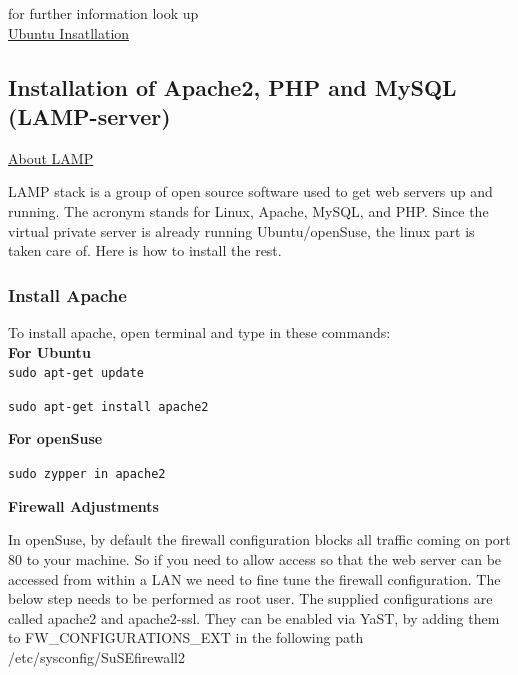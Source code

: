 \documentclass[16pt]{article}
\begin{document}
for further information look up \\

\href{https://help.ubuntu.com/community/WindowsDualBoot}{Ubuntu Insatllation}
  
\hfill


\subsection{Installation of Apache2, PHP and MySQL (LAMP-server)}

\vspace{0.5cm}

{\underline{\Large{About LAMP}}}

  LAMP stack is a group of open source software used to get web servers up
  and running. The acronym stands for Linux, Apache, MySQL, and PHP. Since
  the virtual private server is already running Ubuntu/openSuse, the linux
  part is taken care of. Here is how to install the rest.


  
  

  

  \subsubsection{Install Apache}
  
  \hfill

  To install apache, open terminal and type in these commands: \\
  \textbf{For Ubuntu} \\
  \texttt{sudo apt-get update} 

  \texttt{sudo apt-get install apache2}

  \textbf{For openSuse}

  \texttt{sudo zypper in apache2}

  \textbf{Firewall Adjustments}

  In openSuse, by default the firewall configuration blocks all traffic
  coming on port 80 to your machine. So if you need to allow access so
  that the web server can be accessed from within a LAN we need to fine
  tune the firewall configuration. The below step needs to be performed as
  root user. The supplied configurations are called apache2 and
  apache2-ssl. They can be enabled via YaST, by adding them to
  FW\_CONFIGURATIONS\_EXT in the following path /etc/sysconfig/SuSEfirewall2
  
\end{document}
